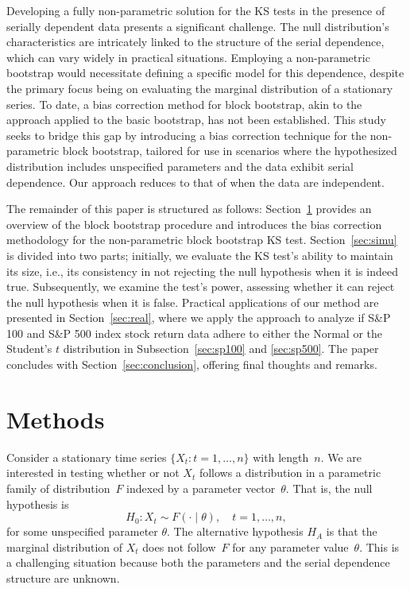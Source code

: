 \documentclass[12pt, titlepage, letterpaper]{article}
\begin{document}
{Developing a fully non-parametric solution for the KS 
tests in the presence of serially dependent data presents a significant 
challenge. The null distribution's characteristics are intricately linked to 
the structure of the serial dependence, which can vary widely in practical 
situations. Employing a non-parametric bootstrap would necessitate defining a 
specific model for this dependence, despite the primary focus being on 
evaluating the marginal distribution of a stationary series. To date, a bias 
correction method for block bootstrap, akin to the approach \citet{babu2004goodness} 
applied to the basic bootstrap, has not been established. This study seeks 
to bridge this gap by introducing a bias correction technique for the 
non-parametric block bootstrap, tailored for use in scenarios where the 
hypothesized distribution includes unspecified parameters and the data 
exhibit serial dependence. Our approach reduces to that of
\citet{babu2004goodness} when the data are independent.


The remainder of this paper is structured as follows: 
Section~\ref{sec:methods} provides an overview of the block bootstrap 
procedure and introduces the bias correction methodology for the 
non-parametric block bootstrap KS test. Section~\ref{sec:simu} is divided 
into two parts; initially, we evaluate the KS test's ability to maintain 
its size, i.e., its consistency in not rejecting the null hypothesis when 
it is indeed true. Subsequently, we examine the test's power, assessing 
whether it can reject the null hypothesis when it is false. Practical 
applications of our method are presented in Section~\ref{sec:real}, where 
we apply the approach to analyze if S\&P 100 and S\&P 500 index stock return data adhere to either the Normal 
or the Student's $t$ distribution in Subsection~\ref{sec:sp100} and
\ref{sec:sp500}. The 
paper concludes with Section~\ref{sec:conclusion}, offering final thoughts 
and remarks.


\section{Methods}
\label{sec:methods}

Consider a stationary time series $\{X_t: t = 1, \ldots, n\}$ with length~$n$.
We are interested in testing whether or not $X_t$ follows a distribution in a
parametric family of distribution~$F$ indexed by a parameter
vector~$\theta$. That is, the null hypothesis is
\[
  H_0: X_t \sim F(\cdot \mid \theta), \quad t = 1, \ldots, n,
\]
for some unspecified parameter $\theta$.
The alternative hypothesis $H_A$ is that the marginal distribution of $X_t$ does
not follow~$F$ for any parameter value~$\theta$. This is a challenging situation
because both the parameters and the serial dependence structure are unknown.

}
\end{document}
